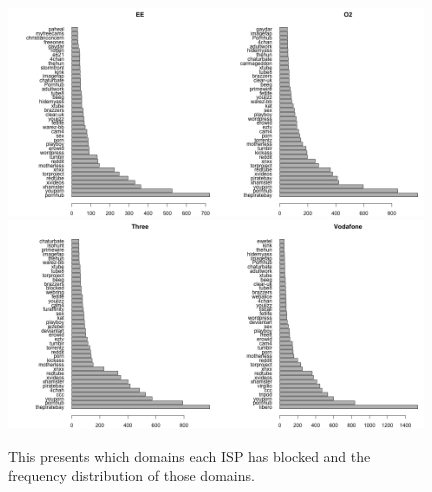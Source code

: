 \documentclass{bmcart}
\begin{document}
\begin{figure}[h!]
\caption{ This presents which domains each ISP has blocked and the frequency distribution of those domains.}
\includegraphics[width=0.49\textwidth]{imgs/EE-blocked-pages-to-date}\includegraphics[width=0.49\textwidth]{imgs/O2-blocked-pages-to-date}
\includegraphics[width=0.49\textwidth]{imgs/Three-blocked-pages-to-date.png}\includegraphics[width=0.49\textwidth]{imgs/Vodafone-blocked-pages-to-date}
\label{fig:mobile-blocked-domains}
\end{figure}
\end{document}
